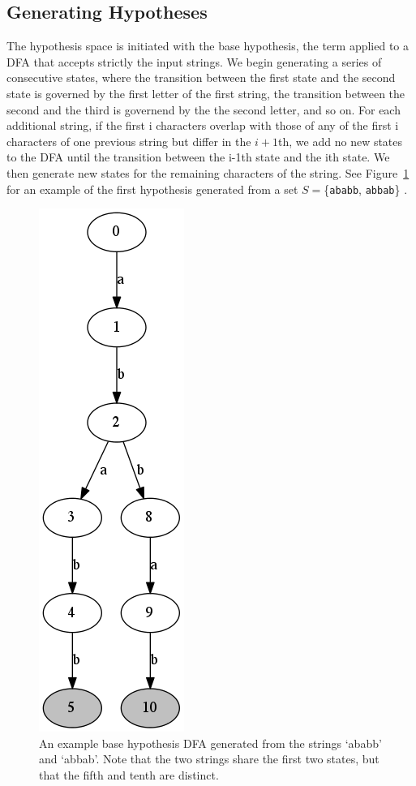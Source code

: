 \documentclass[10pt,letterpaper]{article}
\begin{document}
\subsection{Generating Hypotheses}
The hypothesis space is initiated with the base hypothesis, the term applied to a DFA that accepts strictly the input strings. We begin generating a series of consecutive states, where the transition between the first state and the second state is governed by the first letter of the first string, the transition between the second and the third is governend by the the second letter, and so on. For each additional string, if the first i characters overlap with those of any of the first i characters of one previous string but differ in the $i+1$th, we add no new states to the DFA until the transition between the i-1th state and the ith state. We then generate new states for the remaining characters of the string. See Figure~\ref{base_hypothesis} for an example of the first hypothesis generated from a set $S = $\{\verb!ababb!, \verb!abbab!\} .
  \begin{figure}[ht]
\begin{center}
\includegraphics[scale=0.4]{base_hypothesis.png}
\end{center}
\caption{An example base hypothesis DFA generated from the strings `ababb' and `abbab'. Note that the two strings share the first two states, but that the fifth and tenth are distinct.} 
\label{base_hypothesis}
\end{figure}
\end{document}
